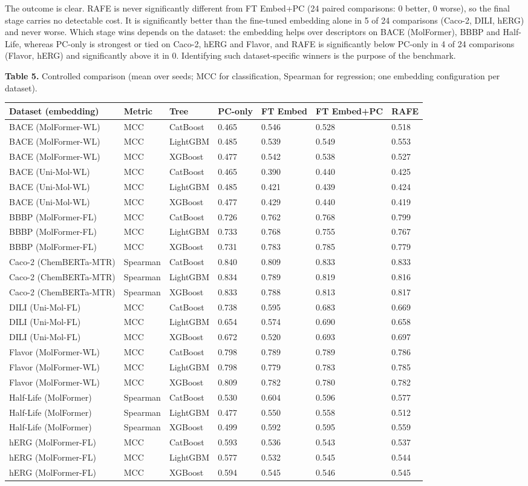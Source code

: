 \documentclass[
  10pt,
]{article}
\begin{document}
The outcome is clear. RAFE is never significantly different from FT
Embed+PC (24 paired comparisons: 0 better, 0 worse), so the final stage
carries no detectable cost. It is significantly better than the
fine-tuned embedding alone in 5 of 24 comparisons (Caco-2, DILI, hERG)
and never worse. Which stage wins depends on the dataset: the embedding
helps over descriptors on BACE (MolFormer), BBBP and Half-Life, whereas
PC-only is strongest or tied on Caco-2, hERG and Flavor, and RAFE is
significantly below PC-only in 4 of 24 comparisons (Flavor, hERG) and
significantly above it in 0. Identifying such dataset-specific winners
is the purpose of the benchmark.

\textbf{Table 5.} Controlled comparison (mean over seeds; MCC for
classification, Spearman for regression; one embedding configuration per
dataset).

\begin{longtable}[]{@{}lllllll@{}}
\toprule
Dataset (embedding) & Metric & Tree & PC-only & FT Embed & FT Embed+PC &
RAFE\tabularnewline
\midrule
\endhead
BACE (MolFormer-WL) & MCC & CatBoost & 0.465 & 0.546 & 0.528 &
0.518\tabularnewline
BACE (MolFormer-WL) & MCC & LightGBM & 0.485 & 0.539 & 0.549 &
0.553\tabularnewline
BACE (MolFormer-WL) & MCC & XGBoost & 0.477 & 0.542 & 0.538 &
0.527\tabularnewline
BACE (Uni-Mol-WL) & MCC & CatBoost & 0.465 & 0.390 & 0.440 &
0.425\tabularnewline
BACE (Uni-Mol-WL) & MCC & LightGBM & 0.485 & 0.421 & 0.439 &
0.424\tabularnewline
BACE (Uni-Mol-WL) & MCC & XGBoost & 0.477 & 0.429 & 0.440 &
0.419\tabularnewline
BBBP (MolFormer-FL) & MCC & CatBoost & 0.726 & 0.762 & 0.768 &
0.799\tabularnewline
BBBP (MolFormer-FL) & MCC & LightGBM & 0.733 & 0.768 & 0.755 &
0.767\tabularnewline
BBBP (MolFormer-FL) & MCC & XGBoost & 0.731 & 0.783 & 0.785 &
0.779\tabularnewline
Caco-2 (ChemBERTa-MTR) & Spearman & CatBoost & 0.840 & 0.809 & 0.833 &
0.833\tabularnewline
Caco-2 (ChemBERTa-MTR) & Spearman & LightGBM & 0.834 & 0.789 & 0.819 &
0.816\tabularnewline
Caco-2 (ChemBERTa-MTR) & Spearman & XGBoost & 0.833 & 0.788 & 0.813 &
0.817\tabularnewline
DILI (Uni-Mol-FL) & MCC & CatBoost & 0.738 & 0.595 & 0.683 &
0.669\tabularnewline
DILI (Uni-Mol-FL) & MCC & LightGBM & 0.654 & 0.574 & 0.690 &
0.658\tabularnewline
DILI (Uni-Mol-FL) & MCC & XGBoost & 0.672 & 0.520 & 0.693 &
0.697\tabularnewline
Flavor (MolFormer-WL) & MCC & CatBoost & 0.798 & 0.789 & 0.789 &
0.786\tabularnewline
Flavor (MolFormer-WL) & MCC & LightGBM & 0.798 & 0.779 & 0.783 &
0.785\tabularnewline
Flavor (MolFormer-WL) & MCC & XGBoost & 0.809 & 0.782 & 0.780 &
0.782\tabularnewline
Half-Life (MolFormer) & Spearman & CatBoost & 0.530 & 0.604 & 0.596 &
0.577\tabularnewline
Half-Life (MolFormer) & Spearman & LightGBM & 0.477 & 0.550 & 0.558 &
0.512\tabularnewline
Half-Life (MolFormer) & Spearman & XGBoost & 0.499 & 0.592 & 0.595 &
0.559\tabularnewline
hERG (MolFormer-FL) & MCC & CatBoost & 0.593 & 0.536 & 0.543 &
0.537\tabularnewline
hERG (MolFormer-FL) & MCC & LightGBM & 0.577 & 0.532 & 0.545 &
0.544\tabularnewline
hERG (MolFormer-FL) & MCC & XGBoost & 0.594 & 0.545 & 0.546 &
0.545\tabularnewline
\bottomrule
\end{longtable}
\end{document}
